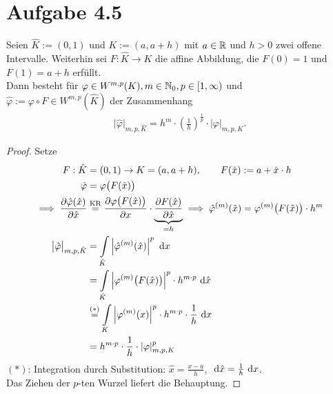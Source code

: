 \documentclass[12pt,a4paper]{article}
\begin{document}
\section*{Aufgabe 4.5}
Seien $\hat{K}:=(0,1)$ und $K:=(a,a+h)$ mit $a\in\mathbb{R}$ und $h>0$ zwei offene Intervalle. Weiterhin sei $F:\hat{K}\to K$ die affine Abbildung, die $F(0)=1$ und $F(1)=a+h$ erfüllt.\\
Dann besteht für $\varphi\in W^{m,p}(K),m\in\mathbb{N}_0,p\in[1,\infty)$ und\\ $\hat{\varphi}:=\varphi\circ F\in W^{m,p}(\hat{K})$ der Zusammenhang
\begin{align*}
\big|\hat{\varphi}\big|_{m,p,\hat{K}}=h^m\cdot \left(\frac{1}{h}\right)^{\frac{1}{p}}\cdot|\varphi|_{m,p,K}.
\end{align*}
\begin{proof}
Setze
\begin{align*}
F:\hat{K}&=(0,1)\to K=(a,a+h),\qquad F(\hat{x}):=a+\hat{x}\cdot h\\
\hat{\varphi}&=\varphi\big(F(\hat{x})\big)\\
\implies
\frac{\partial\hat{\varphi}(\hat{x})}{\partial\hat{x}}&\stackrel{\text{KR}}{=}\frac{\partial\varphi\big(F(\hat{x})\big)}{\partial x}\cdot\underbrace{\frac{\partial F(\hat{x})}{\partial\hat{ x}}}_{=h}
\implies
\hat{\varphi}^{(m)}(\hat{x})=\varphi^{(m)}\big(F(\hat{x})\big)\cdot h^m\\
\big|\hat{\varphi}\big|_{m,p,\hat{K}}
&=\int\limits_{\hat{K}}\left|\hat{\varphi}^{(m)}(\hat{x})\right|^p\text{ d} x\\
&=\int\limits_{\hat{K}}\left|\varphi^{(m)}\big(F(\hat{x})\big)\right|^p\cdot h^{m\cdot p}\text{ d}\hat{x}\\
&\stackrel{(\ast)}{=}
\int\limits_K\left|\varphi^{(m)}(x)\right|^p\cdot h^{m\cdot p}\cdot\frac{1}{h}\text{ d} x\\
&=h^{m\cdot p}\cdot\frac{1}{h}\cdot|\varphi|^p_{m,p,K}
\end{align*}
$(\ast)$: Integration durch Substitution: $\hat{x}=\frac{x-a}{h}$, $\text{ d}\hat{x}=\frac{1}{h}\text{ d} x$.\\
Das Ziehen der $p$-ten Wurzel liefert die Behauptung.
\end{proof}
\end{document}
